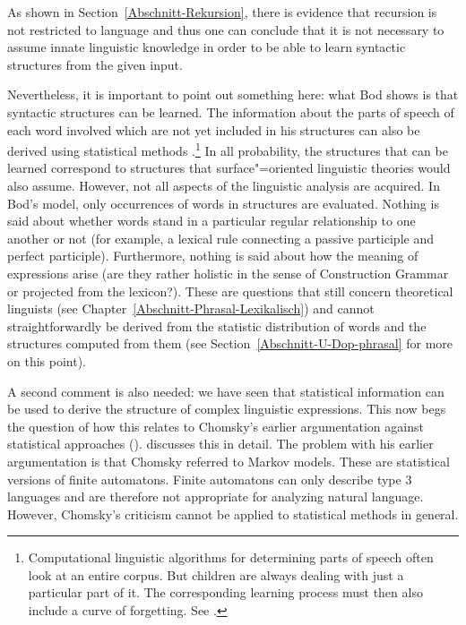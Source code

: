 As shown in Section~\ref{Abschnitt-Rekursion}, there is evidence that recursion is not restricted to language and thus one can conclude that it is not 
necessary to assume innate linguistic knowledge in order to be able to learn syntactic structures from the given input.

Nevertheless, it is important to point out something here: what Bod shows is that syntactic structures can be learned.
The information about the parts of speech of each word involved which are not yet included in his structures can also be derived using
statistical methods \citep{RCF98a,Clark2000a}.\footnote{
	Computational linguistic algorithms for determining parts of speech often look at an entire corpus. But children are always
	dealing with just a particular part of it. The corresponding learning process must then also include a
	curve of forgetting. See . 
} 
In all probability, the structures that can be learned correspond to structures that surface"=oriented linguistic theories would also assume. However, not
all aspects of the linguistic analysis are acquired. In Bod's model, only occurrences of words in structures are evaluated.
Nothing is said about whether words stand in a particular regular relationship to one another or not (for example, a lexical rule connecting a passive
participle and perfect participle). Furthermore, nothing is said about how the meaning of expressions arise (are they rather  holistic in the sense of Construction
Grammar or projected from the lexicon?). These are questions that still concern theoretical linguists (see Chapter~\ref{Abschnitt-Phrasal-Lexikalisch}) 
and cannot straightforwardly be derived from the statistic distribution of words and the structures computed from them (see Section~\ref{Abschnitt-U-Dop-phrasal}
for more on this point).

A second comment is also needed: we have seen that statistical information can be used to derive the structure of complex linguistic expressions. This now
begs the question of how this relates to Chomsky's earlier argumentation against statistical approaches
(\citealp[]{Chomsky57a}). \citet[Section~4.2]{Abney96a} discusses this in detail. The problem with his earlier argumentation is that Chomsky referred
 to Markov models. These are statistical versions of finite automatons. Finite automatons can only describe
type 3 languages and are therefore not appropriate for analyzing natural
language. However, Chomsky's criticism cannot be applied to statistical methods
in general.


